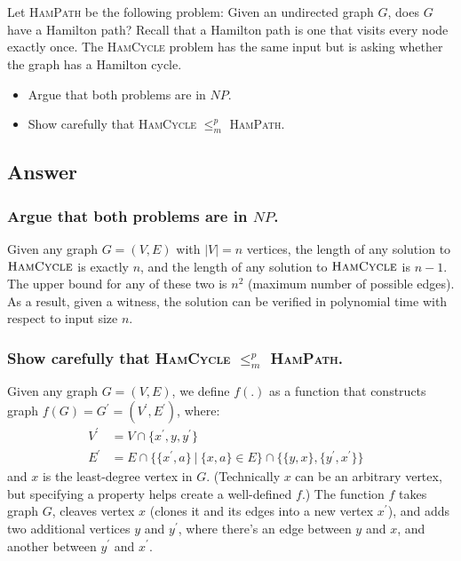 \documentclass[12pt, letterpaper]{article}
\title{\ptitle{}}
\author{\pauthor{}}
\begin{document}
\maketitle

\section{}

Let \textsc{HamPath} be the following problem: Given an undirected graph $G$, does $G$ have a Hamilton path? 
Recall that a Hamilton path is one that visits every node exactly once. 
The \textsc{HamCycle} problem has the same input but is asking whether the graph has a Hamilton cycle.

\begin{itemize}
    \item Argue that both problems are in $NP$.
    \item Show carefully that \textsc{HamCycle} $\leq^p_m$ \textsc{HamPath}.
\end{itemize}

\subsection*{Answer}

\subsubsection*{Argue that both problems are in $NP$.}
Given any graph $G=(V, E)$ with $|V| = n$ vertices, the length of any solution to $\textsc{HamCycle}$ is exactly $n$, and the length of any solution to $\textsc{HamCycle}$ is $n-1$.
The upper bound for any of these two is $n^2$ (maximum number of possible edges).
As a result, given a witness, the solution can be verified in polynomial time with respect to input size $n$.


\subsubsection*{Show carefully that \textsc{HamCycle} $\leq^p_m$ \textsc{HamPath}.}
Given any graph $G = (V, E)$, we define $f(.)$ as a function that constructs graph $f(G) = G^\prime = (V^\prime , E^\prime)$, where:
\begin{align*}
    V^\prime &= V \cap \{ x^\prime, y, y^\prime \} & \\
    E^\prime &= E \cap  \{ \{ x^\prime, a \} \ | \ \{x, a\} \in E \} \cap \{ \{ y, x \} , \{ y^\prime , x^\prime \} \}
\end{align*}
and $x$ is the least-degree vertex in $G$.
(Technically $x$ can be an arbitrary vertex, but specifying a property helps create a well-defined $f$.)
The function $f$ takes graph $G$, cleaves vertex $x$ (clones it and its edges into a new vertex $x^\prime$), and adds two additional vertices $y$ and $y^\prime$, where there's an edge between $y$ and $x$, and another between $y^\prime$ and $x^\prime$.
\end{document}
